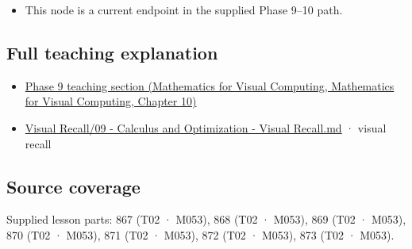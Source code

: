 \begin{itemize}
\tightlist
\item
  This node is a current endpoint in the supplied Phase 9--10 path.
\end{itemize}

\subsection{Full teaching explanation}\label{appendix-54c8f5828387-full-teaching-explanation}

\begin{itemize}
\tightlist
\item
  \href{../02-Mathematics-for-Visual-Computing/main.pdf\#nameddest=02-foundations-ii-ch026-optimization-and-inverse-problems}{Phase 9 teaching section (Mathematics for Visual Computing, Mathematics for Visual Computing, Chapter 10)}
\item
  \hyperref[appendix-adf48f5dc5c1]{Visual Recall/09 - Calculus and Optimization - Visual Recall.md} · visual recall
\end{itemize}

\subsection{Source coverage}\label{appendix-54c8f5828387-source-coverage}

Supplied lesson parts: 867 (T02 · M053), 868 (T02 · M053), 869 (T02 · M053), 870 (T02 · M053), 871 (T02 · M053), 872 (T02 · M053), 873 (T02 · M053).
